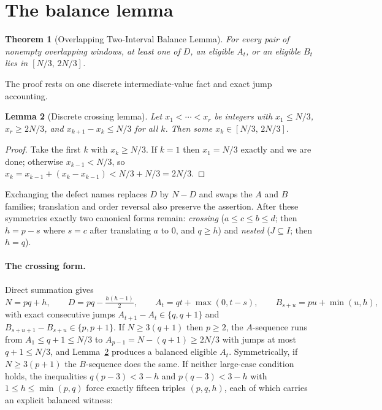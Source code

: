 \documentclass[11pt]{article}
\newtheorem{theorem}{Theorem}[section]
\newtheorem{lemma}[theorem]{Lemma}
\theoremstyle{definition}
\theoremstyle{remark}
\begin{document}
\section{The balance lemma}
\begin{theorem}[Overlapping Two-Interval Balance Lemma]\label{thm:balance}
For every pair of nonempty overlapping windows, at least one of $D$, an eligible $A_t$,
or an eligible $B_t$ lies in $[N/3,\,2N/3]$.
\end{theorem}

The proof rests on one discrete intermediate-value fact and exact jump accounting.

\begin{lemma}[Discrete crossing lemma]\label{lem:crossing}
Let $x_1<\cdots<x_r$ be integers with $x_1\le N/3$, $x_r\ge 2N/3$, and
$x_{k+1}-x_k\le N/3$ for all $k$. Then some $x_k\in[N/3,\,2N/3]$.
\end{lemma}

\begin{proof}
Take the first $k$ with $x_k\ge N/3$. If $k=1$ then $x_1=N/3$ exactly and we are done;
otherwise $x_{k-1}<N/3$, so $x_k=x_{k-1}+(x_k-x_{k-1})<N/3+N/3=2N/3$.
\end{proof}

Exchanging the defect names replaces $D$ by $N-D$ and swaps the $A$ and $B$ families;
translation and order reversal also preserve the assertion. After these symmetries exactly
two canonical forms remain: \emph{crossing} ($a\le c\le b\le d$; then $h=p-s$ where $s=c$
after translating $a$ to $0$, and $q\ge h$) and \emph{nested} ($J\subseteq I$; then
$h=q$).

\paragraph{The crossing form.} Direct summation gives
\[
N=pq+h,\qquad D=pq-\tfrac{h(h-1)}{2},\qquad
A_t=qt+\max(0,t-s),\qquad B_{s+u}=pu+\min(u,h),
\]
with exact consecutive jumps $A_{t+1}-A_t\in\{q,q+1\}$ and
$B_{s+u+1}-B_{s+u}\in\{p,p+1\}$. If $N\ge 3(q+1)$ then $p\ge2$, the $A$-sequence runs
from $A_1\le q+1\le N/3$ to $A_{p-1}=N-(q+1)\ge 2N/3$ with jumps at most $q+1\le N/3$,
and Lemma~\ref{lem:crossing} produces a balanced eligible $A_t$. Symmetrically, if
$N\ge3(p+1)$ the $B$-sequence does the same. If neither large-case condition holds, the
inequalities $q(p-3)<3-h$ and $p(q-3)<3-h$ with $1\le h\le\min(p,q)$ force exactly fifteen
triples $(p,q,h)$, each of which carries an explicit balanced witness:
\end{document}
